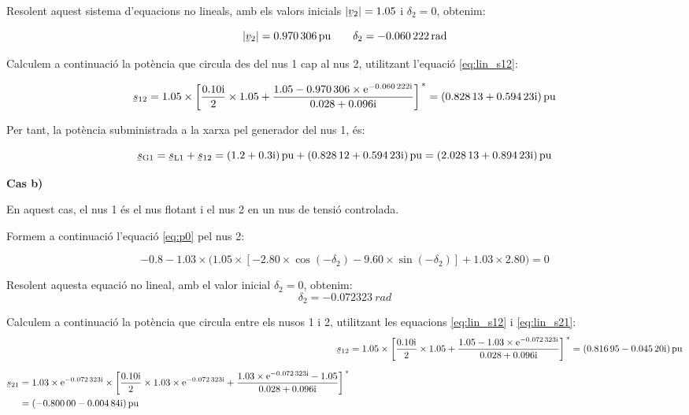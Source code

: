 \begin{exemple}
    Resolent aquest sistema d'equacions no lineals, amb els valors inicials $|\cmplx{v}_2|=\num{1,05}$ i $\delta_2=0$, obtenim:

    \[ |\cmplx{v}_2|=\qty{0,970306}{pu} \qquad \delta_2=\qty{-0,060222}{rad} \]

    Calculem a continuació la potència que circula des del nus 1 cap al
    nus 2, utilitzant l'equació \eqref{eq:lin_s12}:

    \[
    \cmplx{s}_{12} = \num{1,05}\times \left[ \frac{\complexnum{j0,10}}{2} \times \num{1,05} + \frac{ \num{1,05} -
    \num{0,970306}\times\eu^{\complexnum{-j0,060222}}} {\complexnum{0,028+j0,096}} \right]^{\,*} = \complexqty{0,82813 + j0,59423}{pu}
    \]

    Per tant, la potència subministrada a la xarxa pel generador del nus
    1, és:

    \[
    \cmplx{s}\ped{G1} = \cmplx{s}\ped{L1} + \cmplx{s}_{12} = \complexqty{1,2+j0,3}{pu} + \complexqty{0,82812 + j 0,59423}{pu} = \complexqty{2,02813 + j 0,89423}{pu}
    \]

    \textbf{Cas b)}

    En aquest cas, el nus 1 és el nus flotant i el nus 2 en un nus
    de tensió controlada.

    Formem a continuació l'equació \eqref{eq:p0} pel nus 2:

    \[
    \num{-0,8} - \num{1,03}\times \bigl( \num{1,05}\times [\num{-2,80}\times\cos(-\delta_2) - \num{9,60}\times\sin(
    -\delta_2)] + \num{1,03}\times \num{2,80} \bigr) = 0
    \]

    Resolent aquesta equació no lineal, amb el valor inicial $\delta_2=0$, obtenim:
    \[
        \delta_2= \qty{-0,072323}{rad}
    \]

    Calculem a continuació la potència que circula entre els nusos 1 i
    2, utilitzant les equacions \eqref{eq:lin_s12} i \eqref{eq:lin_s21}:
    \begin{align*}
    \cmplx{s}_{12} &= \num{1,05} \times\left[ \frac{\complexnum{j0,10}}{2} \times \num{1,05} + \frac{ \num{1,05} -
    \num{1,03}\times\eu^{\complexnum{-j0,072323}}}{\complexnum{0,028+j0,096}} \right]^{\,*} =
    \complexqty{0,81695 - j 0,04520}{pu} \\[1.5ex]
    \begin{split}
    \cmplx{s}_{21} &= \num{1,03}\times \eu^{\complexnum{-j0,072323}} \times\left[ \frac{\complexnum{j0,10}}{2}\times
    \num{1,03}\times \eu^{\complexnum{-j0,072323}} + \frac{ \num{1,03}\times\eu^{\complexnum{-j0,072323}} -\num{1,05}}
    {\complexnum{0,028+j0,096}} \right]^{\,*} \\
    &= \complexqty{-0,80000 - j 0,00484}{pu}
    \end{split}
    \end{align*}


\end{exemple}
